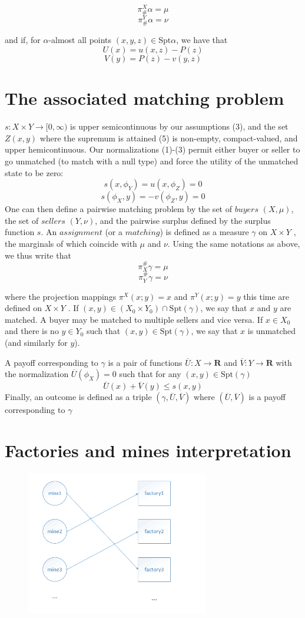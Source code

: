 \documentclass[12pt]{article}
\begin{document}
$$\pi^{X}_{\#}\alpha=\mu$$
$$\pi^{Y}_{\#}\alpha=\nu$$

and if, for $\alpha$-almost all points $(x,y,z) \in \mathrm{Spt} \alpha$, we have that
$$U(x)=u(x,z)-P(z)$$
$$V(y)=P(z)-v(y,z)$$
\section{The associated matching problem}
$s : X \times Y \rightarrow [0,\infty)$ is upper semicontinuous by our assumptions (3), and the
set $Z(x,y)$ where the supremum is attained (5) is non-empty, compact-valued,
and upper hemicontinuous. Our normalizations (1)-(3) permit either buyer or
seller to go unmatched (to match with a null type) and force the utility of the
unmatched state to be zero:
$$s(x,\phi_{Y})=u(x,\phi_{Z})=0$$
$$s(\phi_{X},y)=-v(\phi_{Z},y)=0$$
One can then define a pairwise matching problem by the set of $buyers$ $(X,\mu)$,
the set of $sellers$ $(Y,\nu)$, and the pairwise surplus defined by the surplus function $s$. An $assignment$ (or a $matching$) is defined as a measure $\gamma$ on $X \times Y$ , the
marginals of which coincide with $\mu$ and $\nu$. Using the same notations as above,
we thus write that
$$\pi_{X}^{\#}\gamma=\mu$$
$$\pi_{Y}^{\#}\gamma=\nu$$

where the projection mappings $\pi^{X} (x;y) = x$ and $\pi^{Y} (x;y) = y$ this time are
defined on $X \times Y$ . If $(x,y) \in (X_{0} \times Y_{0} ) \cap \mathrm{Spt}(\gamma)$, we say that $x$ and $y$ are
matched. A buyer may be matched to multiple sellers and vice versa. If $x \in X_{0}$
and there is no $y \in Y_{0}$ such that $(x,y) \in \mathrm{Spt}(\gamma)$, we say that $x$ is unmatched
(and similarly for $y$).



A payoff corresponding to $\gamma$ is a pair of functions $\overline{U}: X\rightarrow \mathbf{R}$ and $\overline{V}: Y\rightarrow \mathbf{R}$
with the normalization
$\overline{U}(\phi_{X})=0$ such that for any $(x,y)\in \mathrm{Spt}(\gamma)$
$$\overline{U}(x)+\overline{V}(y)\leq s(x,y)$$
Finally, an outcome is defined as a triple $(\gamma,\overline{U},\overline{V})$ where $(\overline{U},\overline{V})$ is a payoff corresponding to $\gamma$

\newpage
\section{Factories and mines interpretation}
\begin{figure}[!h]
  \centering
  \includegraphics[width=8cm]{1.png}\\
\end{figure}
\end{document}
